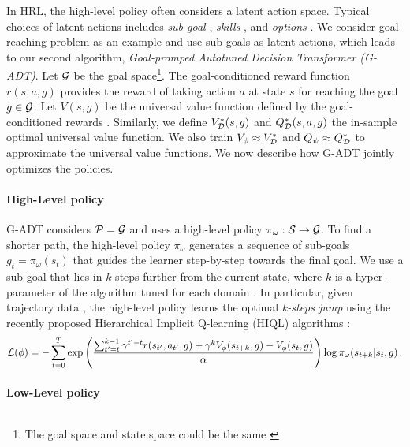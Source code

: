 In HRL, the high-level policy often considers a latent action space. Typical choices of latent actions includes \emph{sub-goal} \citep{nachum2018data,park2023hiql}, \emph{skills} \citep{ajay2020opal,jiang2022efficient}, 
and \emph{options} \citep{sutton1999between,bacon2017option,klissarov2023deep}. 
We consider goal-reaching problem as an example and use sub-goals as latent actions, which leads to our second algorithm, \emph{Goal-promped Autotuned Decision Transformer (G-ADT)}.   
Let ${\mathcal{G}}$ be the goal space\footnote{The goal space and state space could be the same \citep{nachum2018data,park2023hiql}}. 
The goal-conditioned reward function $r(s,a, g)$ provides the reward of taking action $a$ at state $s$ for reaching the goal $g\in{\mathcal{G}}$. Let $V(s,g)$ be the universal value function defined by the goal-conditioned rewards \citep{nachum2018data,schaul2015universal}. 
Similarly, we define $V^*_{{\mathcal{D}}}(s,g)$ and $Q^*_{{\mathcal{D}}}(s,a,g)$ the in-sample optimal universal value function. 
We also train $V_\phi \approx V^*_{{\mathcal{D}}}$ and $Q_\psi \approx Q^*_{{\mathcal{D}}}$ to approximate the universal value functions. 
We now describe how G-ADT jointly optimizes the policies. 


\paragraph{{High-Level policy}} 
G-ADT considers ${\mathcal{P}} = {\mathcal{G}}$ and uses a high-level policy $\pi_\omega: {\mathcal{S}} \rightarrow {\mathcal{G}}$. 
To find a shorter path, the high-level policy $\pi_\omega$ generates a sequence of sub-goals $g_t=\pi_{\omega}(s_t)$ that guides the learner step-by-step towards the final goal.  
We use a sub-goal that lies in $k$-steps further from the current state, where $k$ is a hyper-parameter of the algorithm tuned for each domain \citep{badrinath2023waypoint,park2023hiql}.  
In particular, given trajectory data , the high-level policy learns the optimal \emph{k-steps jump}  using the recently proposed Hierarchical Implicit Q-learning (HIQL) algorithms \citep{park2023hiql}:
\begin{align*}
{\mathcal{L}}(\phi) = -\sum_{t=0}^T \exp\left( \frac{ \sum_{t'=t}^{k-1} \gamma^{t'-t} r(s_{t'}, a_{t'}, g)  + \gamma^{k} V_{\phi}(s_{t+k}, g) - V_{\phi}(s_t, g)}{\alpha}  \right) \log \pi_\omega (s_{t+k} | s_t, g)\, . 
\end{align*}




\paragraph{{Low-Level policy}} 

